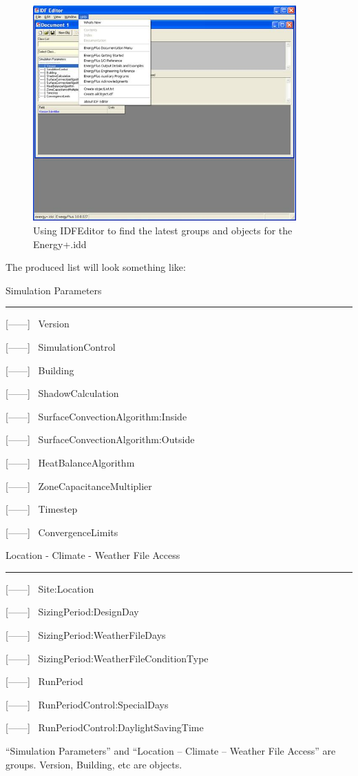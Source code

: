 \begin{figure}[hbtp] %
\centering
\includegraphics[width=0.9\textwidth, height=0.9\textheight, keepaspectratio=true]{media/image002.jpg}
\caption{Using IDFEditor to find the latest groups and objects for the Energy+.idd \protect \label{fig:using-idfeditor-to-find-the-latest-groups}}
\end{figure}

The produced list will look something like:

Simulation Parameters

\begin{center}\rule{0.5\linewidth}{0.4pt}\end{center}

{[}------{]}~ Version

{[}------{]}~ SimulationControl

{[}------{]}~ Building

{[}------{]}~ ShadowCalculation

{[}------{]}~ SurfaceConvectionAlgorithm:Inside

{[}------{]}~ SurfaceConvectionAlgorithm:Outside

{[}------{]}~ HeatBalanceAlgorithm

{[}------{]}~ ZoneCapacitanceMultiplier

{[}------{]}~ Timestep

{[}------{]}~ ConvergenceLimits

Location - Climate - Weather File Access

\begin{center}\rule{0.5\linewidth}{0.4pt}\end{center}

{[}------{]}~ Site:Location

{[}------{]}~ SizingPeriod:DesignDay

{[}------{]}~ SizingPeriod:WeatherFileDays

{[}------{]}~ SizingPeriod:WeatherFileConditionType

{[}------{]}~ RunPeriod

{[}------{]}~ RunPeriodControl:SpecialDays

{[}------{]}~ RunPeriodControl:DaylightSavingTime

``Simulation Parameters'' and ``Location -- Climate -- Weather File Access'' are groups. Version, Building, etc are objects.
